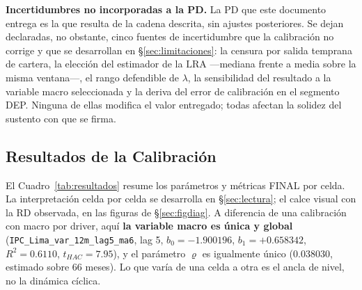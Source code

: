 \documentclass[12pt, a4paper]{article}
\newcommand{\LRA}{\ensuremath{\mathrm{LRA}}}
\renewcommand{\rho}{\ensuremath{\varrho}}
\begin{document}
\noindent\textbf{Incertidumbres no incorporadas a la PD.} La PD que este documento entrega es la que resulta de la cadena descrita, sin ajustes posteriores. Se dejan declaradas, no obstante, cinco fuentes de incertidumbre que la calibración no corrige y que se desarrollan en \S\ref{sec:limitaciones}: la censura por salida temprana de cartera, la elección del estimador de la \LRA{} ---mediana frente a media sobre la misma ventana---, el rango defendible de $\lambda$, la sensibilidad del resultado a la variable macro seleccionada y la deriva del error de calibración en el segmento DEP. Ninguna de ellas modifica el valor entregado; todas afectan la solidez del sustento con que se firma.

\subsection{Resultados de la Calibración}
El Cuadro~\ref{tab:resultados} resume los parámetros y métricas FINAL por celda. La
interpretación celda por celda se desarrolla en \S\ref{sec:lectura}; el calce visual con la RD
observada, en las figuras de \S\ref{sec:figdiag}. A diferencia de una calibración con macro por
driver, aquí \textbf{la variable macro es única y global} (\texttt{IPC\_Lima\_var\_12m\_lag5\_ma6},
lag 5, $b_0=-1.900196$, $b_1=+0.658342$, $R^2=0.6110$, $t_{HAC}=7.95$), y el parámetro $\rho$ es
igualmente único ($0.038030$, estimado sobre 66 meses). Lo que varía de una celda a otra es el
ancla de nivel, no la dinámica cíclica.
\end{document}
